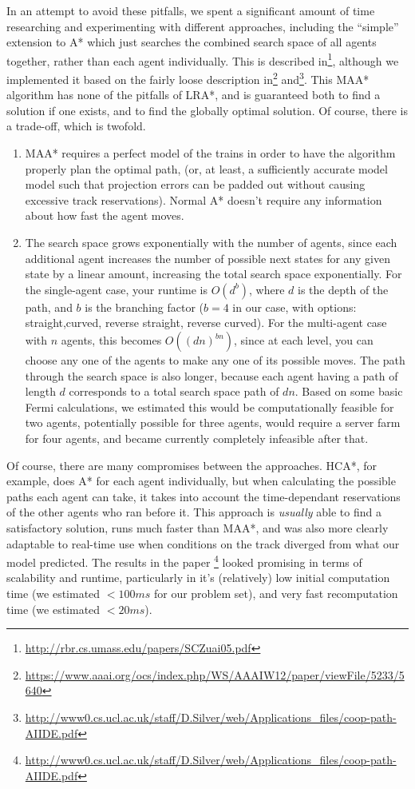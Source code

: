 \documentclass{article}
\begin{document}
In an attempt to avoid these pitfalls, we spent a significant amount of time
researching and experimenting with different approaches, including the ``simple''
extension to A* which just searches the combined search space of all agents
together, rather than each agent individually. This is described
in\footnote{\url{http://rbr.cs.umass.edu/papers/SCZuai05.pdf}}, although we
implemented it based on the fairly loose description
in\footnote{\url{https://www.aaai.org/ocs/index.php/WS/AAAIW12/paper/viewFile/5233/5640}}
and\footnote{\url{http://www0.cs.ucl.ac.uk/staff/D.Silver/web/Applications_files/coop-path-AIIDE.pdf}}.
This MAA* algorithm has none of the pitfalls of LRA*, and is
guaranteed both to find a solution if one exists, and to find the globally
optimal solution. Of course, there is a trade-off, which is twofold.
\begin{enumerate}
\item MAA* requires a perfect model of the trains in order to have the algorithm
	properly plan the optimal path, (or, at least, a sufficiently accurate model model
	such that projection errors can be padded out without causing excessive track reservations).
    Normal A* doesn't require any information about how fast the agent moves.
\item The search space grows exponentially with the number of agents, since
	each additional agent increases the number of possible next states for
	any given state by a linear amount, increasing the total search space
	exponentially. For the single-agent case, your runtime is $O(d^b)$,
	where $d$ is the depth of the path, and $b$ is the branching factor
	($b=4$ in our case, with options: straight,curved, reverse straight,
	reverse curved). For the multi-agent case with $n$ agents, this becomes
	$O((dn)^{bn})$,
	since at each level, you can choose any one of the agents to make any one
	of its possible moves. The path through the search space is also longer,
	because each agent having a path of length $d$ corresponds to a total search
	space path of $dn$. Based on some basic Fermi calculations, we estimated
	this would be computationally feasible for two agents, potentially possible
	for three agents, would require a server farm for four agents, and became currently
	completely infeasible after that.
\end{enumerate}

Of course, there are many compromises between the approaches. HCA*, for
example, does A* for each agent individually, but when calculating the possible
paths each agent can take, it takes into account the time-dependant reservations
of the other agents who ran before it. This approach is \emph{usually} able to
find a satisfactory solution, runs much faster than MAA*, and was also more
clearly adaptable to real-time use when conditions on the track diverged from
what our model predicted. The results in the paper
\footnote{\url{http://www0.cs.ucl.ac.uk/staff/D.Silver/web/Applications_files/coop-path-AIIDE.pdf}}
looked promising in terms of scalability and runtime, particularly in it's
(relatively) low initial computation time (we estimated $<100ms$ for our problem
set), and very fast recomputation time (we estimated $<20ms$).
\end{document}
